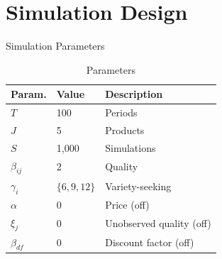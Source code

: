 \documentclass[aspectratio=169,professionalfonts]{beamer}
\newcommand{\E}{\mathbb{E}}
\newcommand{\hl}[1]{\textbf{\textcolor{UGARed}{#1}}}
\begin{document}
%
%
%
\section{Simulation Design}

\begin{frame}{Simulation Parameters}
  \begin{table}
    \centering
    \caption{Parameters}
    \begin{tabular}{lll}
      \toprule
      Param. & Value & Description \\
      \midrule
      $T$         & 100             & Periods \\
      $J$         & 5               & Products \\
      $S$         & 1{,}000         & Simulations \\
      $\beta_{ij}$   & 2             & Quality \\
      $\gamma_i$     & $\{6, 9, 12\}$ & Variety-seeking \\
      $\alpha$    & 0               & Price (off) \\
      $\xi_j$     & 0               & Unobserved quality (off) \\
      $\beta_{df}$    & 0             & Discount factor (off) \\
      \bottomrule
    \end{tabular}
  \end{table}
\end{frame}
\end{document}
